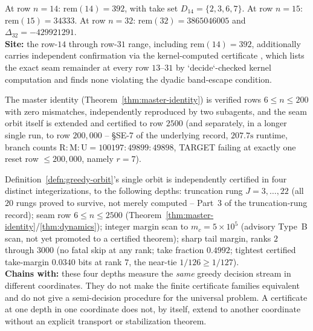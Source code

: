 \begin{obs}
\label{obs:anchors-low}
At row $n=14$: $\mathrm{rem}(14) = 392$, with take set $D_{14} = \{2,3,6,7\}$. At row $n=15$:
$\mathrm{rem}(15) = 34333$. At row $n=32$: $\mathrm{rem}(32) = 3865046005$ and $\Delta_{32} =
-429921291$.   \\
\textbf{Site:} the row-$14$ through row-$31$ range, including $\mathrm{rem}(14)=392$, additionally
carries independent  confirmation via the kernel-computed certificate
,
which lists the exact seam remainder at every row $13$--$31$ by `decide`-checked kernel computation
and finds none violating the dyadic band-escape condition.
\end{obs}

\begin{obs}
\label{obs:anchors-depth}
The master identity (Theorem~\ref{thm:master-identity}) is verified rows $6 \le n \le 200$ with zero
mismatches, independently reproduced by two subagents, and the seam orbit itself is extended and
certified to row $2500$ (and separately, in a longer single run, to row $200{,}000$ -- \S SE-7 of the
underlying record, $207.7\mathrm{s}$ runtime, branch counts $\mathrm{R{:}M{:}U} =
100197{:}49899{:}49898$, TARGET failing at exactly one reset row $\le 200{,}000$, namely $r=7$).
  
\end{obs}

\begin{obs}
\label{obs:anchors-coords}
Definition~\ref{defn:greedy-orbit}'s single orbit is independently certified in four distinct
integerizations, to the following depths: truncation rung $J = 3,\dots,22$ (all $20$ rungs proved to
survive, not merely computed -- Part~3 of the truncation-rung record); seam row $6 \le n \le 2500$
(Theorem~\ref{thm:master-identity}/\ref{thm:dynamics}); integer margin scan to $m_c = 5\times10^5$
(advisory Type~B scan, not yet promoted to a certified theorem); sharp tail margin, ranks $2$ through
$3000$ (no fatal skip at any rank; take fraction $0.4992$; tightest certified take-margin
$0.0340$ bits at rank $7$, the near-tie $1/126 \ge 1/127$). 
 \\
\textbf{Chains with:} these four depths measure the \emph{same} greedy decision stream in different
coordinates. They do not make the finite certificate families equivalent and do not give a
semi-decision procedure for the universal problem. A certificate at one depth in one coordinate
does not, by itself, extend to another coordinate without an explicit transport or stabilization
theorem.
\end{obs}

